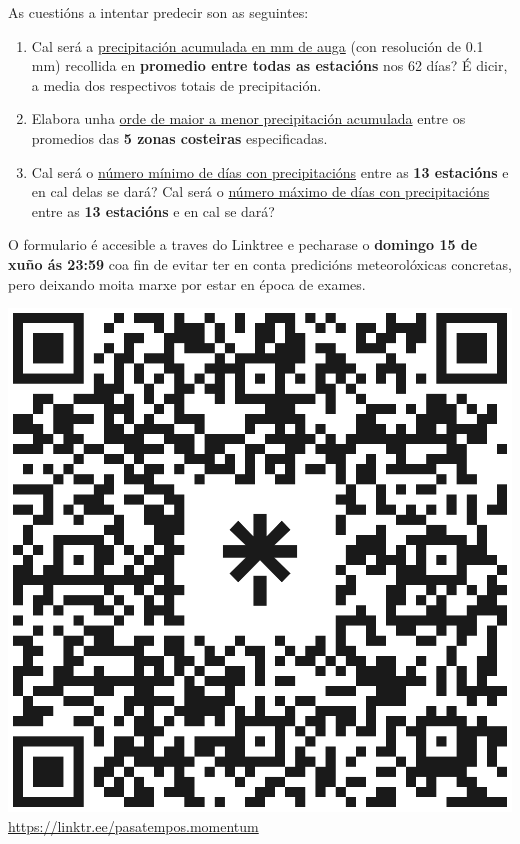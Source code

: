 \begin{multicols}{2}
\vspace{4px}
As cuestións a intentar predecir son as seguintes:
\vspace{-4px}
\begin{enumerate}
	\item Cal será a \ul{precipitación acumulada en mm de auga} (con resolución de 0.1 mm) recollida en \textbf{promedio entre todas as estacións} nos 62 días? É dicir, a media dos respectivos totais de precipitación.
	\item Elabora unha \ul{orde de maior a menor precipitación acumulada} entre os promedios das \textbf{5 zonas costeiras} especificadas.
	\item Cal será o \ul{número mínimo de días con precipitacións} entre as \textbf{13 estacións} e en cal delas se dará? Cal será o \ul{número máximo de días con precipitacións} entre as \textbf{13 estacións} e en cal se dará?
\end{enumerate}
 
O formulario é accesible a traves do Linktree e pecharase o \textbf{domingo 15 de xuño ás 23:59} coa fin de evitar ter en conta predicións meteorolóxicas concretas, pero deixando moita marxe por estar en época de exames.

\begin{center}
    \includegraphics[width=0.4\linewidth]{revistas/002/imaxes/pasatempos_momentum.png}
    \url{https://linktr.ee/pasatempos.momentum}
\end{center}

\end{multicols}